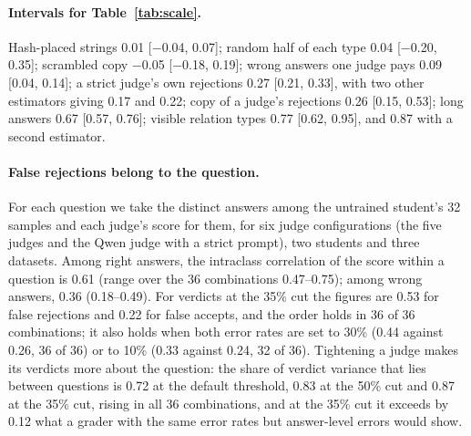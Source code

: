 \documentclass[11pt,a4paper,twocolumn]{article}
\begin{document}
\paragraph{Intervals for Table~\ref{tab:scale}.} Hash-placed strings 0.01 [$-$0.04, 0.07]; random half of each type 0.04 [$-$0.20, 0.35]; scrambled copy $-$0.05 [$-$0.18, 0.19]; wrong answers one judge pays 0.09 [0.04, 0.14]; a strict judge's own rejections 0.27 [0.21, 0.33], with two other estimators giving 0.17 and 0.22; copy of a judge's rejections 0.26 [0.15, 0.53]; long answers 0.67 [0.57, 0.76]; visible relation types 0.77 [0.62, 0.95], and 0.87 with a second estimator.

\paragraph{False rejections belong to the question.} For each question we take the distinct answers among the untrained student's 32 samples and each judge's score for them, for six judge configurations (the five judges and the Qwen judge with a strict prompt), two students and three datasets. Among right answers, the intraclass correlation of the score within a question is 0.61 (range over the 36 combinations 0.47--0.75); among wrong answers, 0.36 (0.18--0.49). For verdicts at the 35\% cut the figures are 0.53 for false rejections and 0.22 for false accepts, and the order holds in 36 of 36 combinations; it also holds when both error rates are set to 30\% (0.44 against 0.26, 36 of 36) or to 10\% (0.33 against 0.24, 32 of 36). Tightening a judge makes its verdicts more about the question: the share of verdict variance that lies between questions is 0.72 at the default threshold, 0.83 at the 50\% cut and 0.87 at the 35\% cut, rising in all 36 combinations, and at the 35\% cut it exceeds by 0.12 what a grader with the same error rates but answer-level errors would show.
\end{document}
